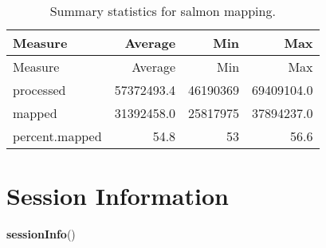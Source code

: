 \documentclass[]{article}
\newenvironment{Shaded}{\begin{snugshade}}{\end{snugshade}}
\newcommand{\DataTypeTok}[1]{\textcolor[rgb]{0.13,0.29,0.53}{#1}}
\newcommand{\KeywordTok}[1]{\textcolor[rgb]{0.13,0.29,0.53}{\textbf{#1}}}
\newcommand{\NormalTok}[1]{#1}
\newcommand{\OperatorTok}[1]{\textcolor[rgb]{0.81,0.36,0.00}{\textbf{#1}}}
\newcommand{\StringTok}[1]{\textcolor[rgb]{0.31,0.60,0.02}{#1}}
\begin{document}
\begin{Shaded}
\end{Shaded}

\begin{longtable}[]{@{}lrrr@{}}
\caption{Summary statistics for salmon mapping.}\tabularnewline
\toprule
Measure & Average & Min & Max\tabularnewline
\midrule
\endfirsthead
\toprule
Measure & Average & Min & Max\tabularnewline
\midrule
\endhead
processed & 57372493.4 & 46190369 & 69409104.0\tabularnewline
mapped & 31392458.0 & 25817975 & 37894237.0\tabularnewline
percent.mapped & 54.8 & 53 & 56.6\tabularnewline
\bottomrule
\end{longtable}

\hypertarget{session-information}{%
\section{Session Information}\label{session-information}}

\begin{Shaded}
\begin{Highlighting}[]
\KeywordTok{sessionInfo}\NormalTok{()}
\end{Highlighting}
\end{Shaded}
\end{document}
